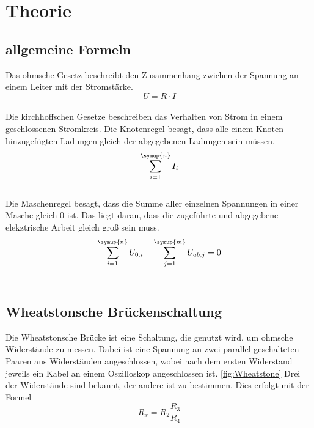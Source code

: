\section{Theorie}
\label{sec:Theorie}
    \subsection{allgemeine Formeln}
    Das ohmsche Gesetz beschreibt den Zusammenhang zwichen der Spannung an einem Leiter mit der Stromstärke.
    \begin{equation}
        U=R \cdot I
        \label{eqn:ohm}
    \end{equation}\\
    Die kirchhoffschen Gesetze beschreiben das Verhalten von Strom in einem geschlossenen Stromkreis.
    Die Knotenregel besagt, dass alle einem Knoten hinzugefügten Ladungen gleich der abgegebenen Ladungen sein müssen.
    \begin{equation}
        \sum_{i=1}^{\symup{n}}{I_i}
        \label{eqn:knoten}
    \end{equation}\\
    Die Maschenregel besagt, dass die Summe aller einzelnen Spannungen in einer Masche gleich 0 ist. 
    Das liegt daran, dass die zugeführte und abgegebene elekztrische Arbeit gleich groß sein muss.
    \begin{equation}
        \sum_{i=1}^{\symup{n}}{U_{0,i}} - \sum_{j=1}^{\symup{m}}{U_{ab,j}} =0
        \label{eqn:masche}
    \end{equation}\\

    \subsection{Wheatstonsche Brückenschaltung}
    Die Wheatstonsche Brücke ist eine Schaltung, die genutzt wird, um ohmsche Widerstände zu messen.
    Dabei ist eine Spannung an zwei parallel geschalteten Paaren aus Widerständen angeschlossen, wobei nach dem ersten Widerstand jeweils ein Kabel an einem Oszilloskop angeschlossen ist.
    \ref{fig:Wheatstone}
    Drei der Widerstände sind bekannt, der andere ist zu bestimmen.
    Dies erfolgt mit der Formel
    \begin{equation}
        R_x=R_2 \frac{R_3}{R_4}
        \label{eqn:widerstand}
    \end{equation}

